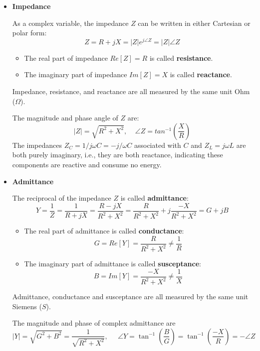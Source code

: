\documentclass{article}
\begin{document}
\begin{itemize}
  \item {\bf Impedance}

    As a complex variable, the impedance $Z$ can be written in either
    Cartesian or polar form:
    \begin{equation}	
      Z=R+jX=|Z|e^{j\angle Z}=|Z|\angle Z	
    \end{equation}
    \begin{itemize}
    \item The real part of impedance $Re[Z]=R$ is called {\bf resistance}. 
    \item The imaginary part of impedance  $Im[Z]=X$ is called {\bf reactance}. 
    \end{itemize}
    Impedance, resistance, and reactance are all measured by the same unit 
    Ohm ($\Omega$). 

    The magnitude and phase angle of $Z$ are:
    \begin{equation}
      |Z|=\sqrt{R^2+X^2},\;\;\;\;\angle Z=tan^{-1}\left(\frac{X}{R}\right)	
    \end{equation}
    The impedances $Z_C=1/j\omega C=-j/\omega C$ associated with $C$ and 
    $Z_L=j\omega L$ are both purely imaginary, i.e., they are both reactance,
    indicating these components are reactive and consume no energy.

\item {\bf Admittance}

  The reciprocal of the impedance $Z$ is called {\bf admittance}:
  \begin{equation}
    Y=\frac{1}{Z}=\frac{1}{R+jX}=\frac{R-jX}{R^2+X^2}
    =\frac{R}{R^2+X^2}+j\frac{-X}{R^2+X^2}=G+jB	
  \end{equation}
  \begin{itemize}
  \item The real part of admittance is called {\bf conductance}:
    \begin{equation}	
      G=Re[Y]=\frac{R}{R^2+X^2}	\ne \frac{1}{R}
    \end{equation}
  \item The imaginary part of admittance is called {\bf susceptance}:
    \begin{equation}
      B=Im[Y]=\frac{-X}{R^2+X^2} \ne \frac{1}{X}
    \end{equation}
  \end{itemize}
  Admittance, conductance and susceptance are all measured by the same 
  unit Siemens ($S$). 

  The magnitude and phase of complex admittance are
  \begin{equation}
    |Y|=\sqrt{G^2+B^2}=\frac{1}{\sqrt{R^2+X^2}},\;\;\;\;\;
    \angle Y=\tan^{-1} \left(\frac{B}{G}\right)=\tan^{-1} \left(\frac{-X}{R}\right)
    =-\angle Z	
  \end{equation}
\end{itemize}
\end{document}
